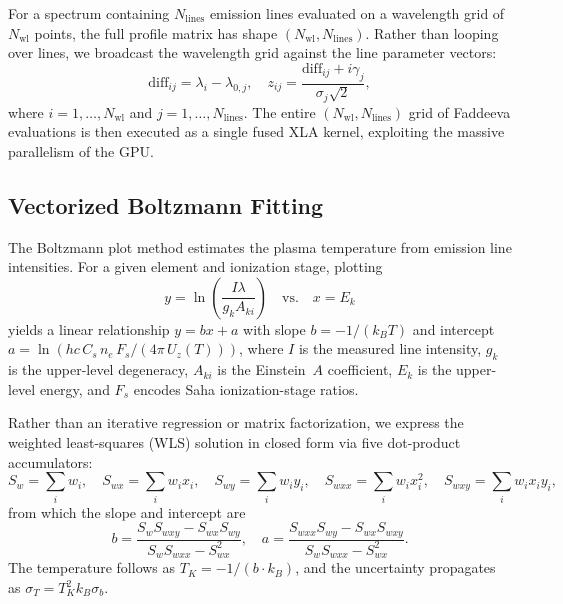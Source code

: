 \documentclass[preprint,12pt,authoryear]{elsarticle}
\begin{document}
For a spectrum containing $N_\mathrm{lines}$ emission lines evaluated on a wavelength grid of $N_\mathrm{wl}$ points, the full profile matrix has shape $(N_\mathrm{wl}, N_\mathrm{lines})$.
Rather than looping over lines, we broadcast the wavelength grid against the line parameter vectors:
\begin{equation}
  \mathrm{diff}_{ij} = \lambda_i - \lambda_{0,j}, \quad
  z_{ij} = \frac{\mathrm{diff}_{ij} + i\gamma_j}{\sigma_j \sqrt{2}},
  \label{eq:voigt-broadcast}
\end{equation}
where $i = 1, \ldots, N_\mathrm{wl}$ and $j = 1, \ldots, N_\mathrm{lines}$.
The entire $(N_\mathrm{wl}, N_\mathrm{lines})$ grid of Faddeeva evaluations is then executed as a single fused XLA kernel, exploiting the massive parallelism of the GPU.

\subsection{Vectorized Boltzmann Fitting}
\label{sec:boltzmann}

The Boltzmann plot method \citep{Tognoni2010} estimates the plasma temperature from emission line intensities.
For a given element and ionization stage, plotting
\begin{equation}
  y = \ln\!\left(\frac{I \lambda}{g_k A_{ki}}\right)
  \quad \text{vs.} \quad
  x = E_k
  \label{eq:boltzmann-plot}
\end{equation}
yields a linear relationship $y = bx + a$ with slope $b = -1/(k_B T)$ and intercept $a = \ln(hc\, C_s\, n_e\, F_s / (4\pi\, U_z(T)))$, where $I$ is the measured line intensity, $g_k$ is the upper-level degeneracy, $A_{ki}$ is the Einstein~$A$ coefficient, $E_k$ is the upper-level energy, and $F_s$ encodes Saha ionization-stage ratios.

Rather than an iterative regression or matrix factorization, we express the weighted least-squares (WLS) solution in closed form via five dot-product accumulators:
\begin{equation}
  S_w = \sum_i w_i, \quad
  S_{wx} = \sum_i w_i x_i, \quad
  S_{wy} = \sum_i w_i y_i, \quad
  S_{wxx} = \sum_i w_i x_i^2, \quad
  S_{wxy} = \sum_i w_i x_i y_i,
  \label{eq:boltzmann-sums}
\end{equation}
from which the slope and intercept are
\begin{equation}
  b = \frac{S_w S_{wxy} - S_{wx} S_{wy}}{S_w S_{wxx} - S_{wx}^2}, \quad
  a = \frac{S_{wxx} S_{wy} - S_{wx} S_{wxy}}{S_w S_{wxx} - S_{wx}^2}.
  \label{eq:boltzmann-slope}
\end{equation}
The temperature follows as $T_K = -1/(b \cdot k_B)$, and the uncertainty propagates as $\sigma_T = T_K^2 k_B \sigma_b$.
\end{document}
